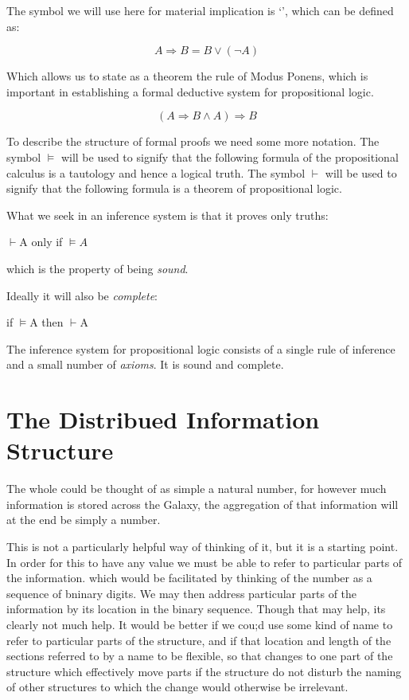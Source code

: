 \documentclass[10pt,titlepage]{article}
\begin{document}
The symbol we will use here for material implication is `\Rightarrow{}', which can be defined as:


\[ A \Rightarrow{} B = B \lor{} (\lnot{} A)\]

Which allows us to state as a theorem the rule of Modus Ponens, which is important in establishing a formal deductive system for propositional logic.


\[ (A \Rightarrow{} B \land{} A)  \Rightarrow{} B\]

To describe the structure of formal proofs we need some more notation.
The symbol $\vDash{}$ will be used to signify that the following formula of the propositional calculus is a tautology and hence a logical truth.
The symbol  $\vdash{}$ will be used to signify that the following formula is a theorem of propositional logic.

What we seek in an inference system is that it proves only truths:

\begin{center}
  $\vdash{}$A only if $\vDash{}A$
  \end{center}

which is the property of being \emph{sound}.

Ideally it will also be \emph{complete}:

\begin{center}
  if $\vDash{}$A then $\vdash{}$A
\end{center}

The inference system for propositional logic consists of a single rule of inference and a small number of \emph{axioms}.
It is sound and complete.


\section{The Distribued Information Structure}

The whole could be thought of as simple a natural number, for however much information is stored across the Galaxy, the aggregation of that information will at the end be simply a number.

This is not a particularly helpful way of thinking of it, but it is a starting point.
In order for this to have any value we must be able to refer to particular parts of the information. which would be facilitated by thinking of the number as a sequence of bninary digits.
We may then address particular parts of the information by its location in the binary sequence.
Though that may help, its clearly not much help.
It would be better if we cou;d use some kind of name to refer to particular parts of the structure, and if that location and length of the sections referred to by a name to be flexible, so that changes to one part of the structure which effectively move parts if the structure do not disturb the naming of other structures to which the change would otherwise be irrelevant.
\end{document}
